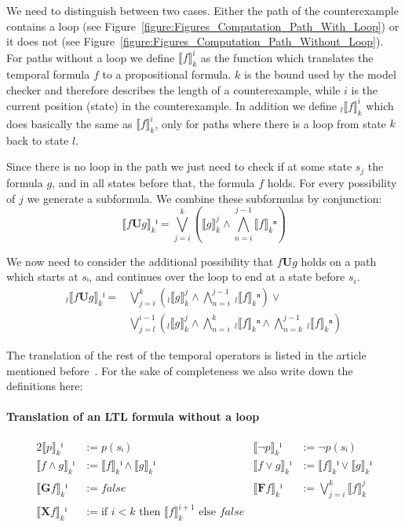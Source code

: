 \documentclass[a4paper, 12pt]{article}
\begin{document}
We need to distinguish between two cases. Either the path of the
counterexample contains a loop (see
Figure~\ref{figure:Figures_Computation_Path_With_Loop}) or it does not (see
Figure~\ref{figure:Figures_Computation_Path_Without_Loop}). For paths without
a loop we define $⟦f⟧_k^i$ as the function which translates the temporal
formula $f$ to a propositional formula. $k$ is the bound used by the model
checker and therefore describes the length of a counterexample, while $i$ is
the current position (state) in the counterexample. In addition we define
$_l⟦f⟧_k^i$ which does basically the same as $⟦f⟧_k^i$, only for paths where
there is a loop from state $k$ back to state $l$.

\begin{description}[style=multiline, leftmargin=4cm]

    \item[Path without loop] Since there is no loop in the path we just need
    to check if at some state $s_j$ the formula $g$, and in all states before
    that, the formula $f$ holds. For every possibility of $j$ we generate a
    subformula. We combine these subformulas by conjunction:
    \[
        ⟦f\mathbf{U}g ⟧_kⁱ =
        ⋁_{j=i}^{k}\left(⟦g⟧_k^j ∧ ⋀_{n=i}^{j-1} ⟦f⟧_kⁿ\right)
    \]

    \item[Path with loop] We now need to consider the additional possibility
    that $f\mathbf{U}g$ holds on a path which starts at $sᵢ$, and continues
    over the loop to end at a state before $s_i$.
    \begin{align*}
        _l⟦ f\mathbf{U}g ⟧_kⁱ =
        & ⋁_{j=i}^{k}\left(_l⟦ g ⟧_k^j ∧ ⋀_{n=i}^{j-1} ~_l⟦ f ⟧_kⁿ\right) ∨\\
        & ⋁_{j=l}^{i-1}\left(
            _l⟦ g ⟧_k^j ∧
            ⋀_{n=i}^{k} ~_l⟦ f ⟧_kⁿ ∧
            ⋀_{n=k}^{j-1} ~_l⟦ f ⟧_kⁿ
        \right)
    \end{align*}

\end{description}

The translation of the rest of the temporal operators is listed in the article
mentioned before~\cite{Biere1999SymbolicModelChecking}. For the sake of
completeness we also write down the definitions here:

\paragraph{Translation of an LTL formula without a loop}
\begin{alignat*}{2}
    ⟦p⟧_kⁱ              &:= p(sᵢ)\quad\quad&
    ⟦¬p⟧_kⁱ             &:= ¬ p(sᵢ)\\
    ⟦f ∧ g⟧_kⁱ          &:= ⟦f⟧_kⁱ ∧ ⟦g⟧_kⁱ\quad\quad&
    ⟦f ∨ g⟧_kⁱ          &:= ⟦f⟧_kⁱ ∨ ⟦g⟧_kⁱ\\
    ⟦\mathbf{G} f⟧_kⁱ   &:= false\quad\quad&
    ⟦\mathbf{F} f⟧_kⁱ   &:= ⋁_{j=i}^k ⟦f⟧_k^{j}\\
    ⟦\mathbf{X} f⟧_kⁱ   &:= \text{if } i<k \text{ then } ⟦f⟧_k^{i+1}
                                           \text{ else } false
\end{alignat*}
\end{document}
